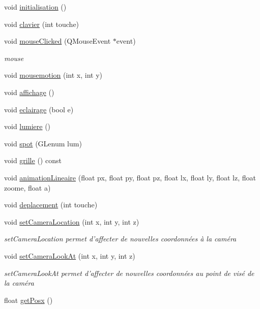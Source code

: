\begin{DoxyCompactItemize}
\item 
void \hyperlink{classScene_a278d69cec31d0f217f66d6d5b835c1cf}{initialisation} ()
\item 
void \hyperlink{classScene_a21d0fc2e44e61436e2434790c71e6d79}{clavier} (int touche)
\item 
void \hyperlink{classScene_af43ee036671541ec134792751a57a83f}{mouse\-Clicked} (Q\-Mouse\-Event $\ast$event)
\begin{DoxyCompactList}\small\item\em mouse \end{DoxyCompactList}\item 
void \hyperlink{classScene_af8819619897d14c6e58655252d4c5f37}{mousemotion} (int x, int y)
\item 
void \hyperlink{classScene_aeb3584af02d5818a17ea91eb5d19fc92}{affichage} ()
\item 
void \hyperlink{classScene_a76bd2b46fa79e3a939ea87c9da2d8928}{eclairage} (bool e)
\item 
void \hyperlink{classScene_a38a063de5f88ffefc9a7ef90e9ba23cb}{lumiere} ()
\item 
void \hyperlink{classScene_aaea9ff8b946f2d004037b116e5a53f08}{spot} (G\-Lenum lum)
\item 
void \hyperlink{classScene_a576e0cdbd359e0888ba33d2f004365c3}{grille} () const 
\item 
void \hyperlink{classScene_a5e9920a83e80a09a255c8c17052b1313}{animation\-Lineaire} (float px, float py, float pz, float lx, float ly, float lz, float zoome, float a)
\item 
void \hyperlink{classScene_ab546e6e73c981e816c95c96436f86a4f}{deplacement} (int touche)
\item 
void \hyperlink{classScene_af64db0a4c0a5986b12624caefaf6d6e4}{set\-Camera\-Location} (int x, int y, int z)
\begin{DoxyCompactList}\small\item\em set\-Camera\-Location permet d'affecter de nouvelles coordonnées à la caméra \end{DoxyCompactList}\item 
void \hyperlink{classScene_ac9e914eb62fd1520fd3ad0000f2015de}{set\-Camera\-Look\-At} (int x, int y, int z)
\begin{DoxyCompactList}\small\item\em set\-Camera\-Look\-At permet d'affecter de nouvelles coordonnées au point de visé de la caméra \end{DoxyCompactList}\item 
float \hyperlink{classScene_a77b47fda37a4f654c2afc1369243cc71}{get\-Posx} ()

\end{DoxyCompactItemize}
